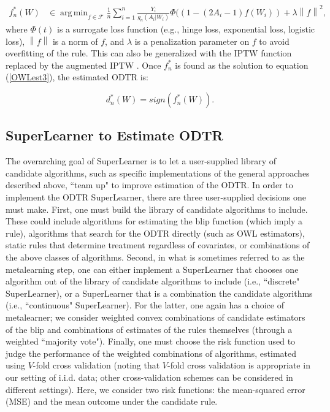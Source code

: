 \documentclass[a4paper,12pt]{article}
\DeclareMathOperator*{\argmin}{arg\,min}
\begin{document}
\begin{align}\label{OWLest3}
    f_n^*(W) & \in \argmin_{f\in \mathcal{F}} \frac{1}{n} \sum_{i=1}^n \frac{Y_i}{g_n (A_i|W_i)}\Phi((1-(2A_i-1)f(W_i))+ \lambda \left\lVert f \right\rVert^2,
\end{align}
where $\Phi(t)$ is a surrogate loss function (e.g., hinge loss, exponential loss, logistic loss), $\left\lVert f \right\rVert$ is a norm of $f$, and $\lambda$ is a penalization parameter on $f$ to avoid overfitting of the rule. This can also be generalized with the IPTW function replaced by the augmented IPTW \citep{luedtke2016super, rubin2012statistical}. Once $f_n^*$ is found as the solution to equation (\ref{OWLest3}), the estimated ODTR is: 

\[d_n^*(W)=sign(f_n^* (W)).\]

\subsection{SuperLearner to Estimate ODTR}

The overarching goal of SuperLearner is to let a user-supplied library of candidate algorithms, such as specific implementations of the general approaches described above, ``team up" to improve estimation of the ODTR. In order to implement the ODTR SuperLearner, there are three user-supplied decisions one must make. First, one must build the library of candidate algorithms to include. These could include algorithms for estimating the blip function (which imply a rule), algorithms that search for the ODTR directly (such as OWL estimators), static rules that determine treatment regardless of covariates, or combinations of the above classes of algorithms. Second, in what is sometimes referred to as the metalearning step, one can either implement a SuperLearner that chooses one algorithm out of the library of candidate algorithms to include (i.e., ``discrete" SuperLearner), or a SuperLearner that is a combination the candidate algorithms (i.e., ``continuous" SuperLearner). For the latter, one again has a choice of metalearner; we consider weighted convex combinations of candidate estimators of the blip and combinations of estimates of the rules themselves (through a weighted ``majority vote"). Finally, one must choose the risk function used to judge the performance of the weighted combinations of algorithms, estimated using $V$-fold cross validation (noting that $V$-fold cross validation is appropriate in our setting of i.i.d. data; other cross-validation schemes can be considered in different settings). Here, we consider two risk functions: the mean-squared error (MSE) and the mean outcome under the candidate rule. 
\end{document}
